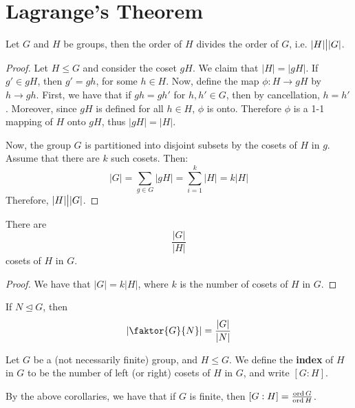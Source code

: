\section{Lagrange's Theorem}
\label{section_3.3}

\begin{theorem}\label{theorem_3.3.1}
  Let $G$ and  $H$ be groups, then the order of $H$ divides the order
  of $G$, i.e. $|H| \big{|} |G|$.
\end{theorem}
\begin{proof}
  Let $H \leq G$ and consider the coset $gH$. We claim that  $|H|=|gH|$.
  If $g' \in gH$, then  $g'=gh$, for some  $h \in H$. Now, define the map
  $\phi:H \rightarrow gH$ by $h \rightarrow gh$. First, we have that  if
  $gh=gh'$ for  $h,h' \in G$, then by cancellation, $h=h'$. Moreover, since
  $gH$ is defined for all  $h \in H$,  $\phi$ is onto. Therefore  $\phi$ is a
  1-1 mapping of  $H$ onto  $gH$, thus  $|gH|=|H|$.

  Now, the group $G$ is partitioned into disjoint subsets by the cosets of
  $H$ in  $g$. Assume that there are $k$ such cosets. Then:
  \begin{equation*}
    |G|=\sum_{g \in G}{|gH|}=\sum_{i=1}^k{|H|}=k|H|
  \end{equation*}
  Therefore, $|H| \big{|} |G|$.
\end{proof}
\begin{corollary}
  There are
  \begin{equation*}
    \frac{|G|}{|H|}
  \end{equation*}
  cosets of $H$ in  $G$.
\end{corollary}
\begin{proof}
  We have that $|G|=k|H|$, where  $k$ is the number of cosets of  $H$
  in  $G$.
\end{proof}
\begin{corollary}
  If $N \unlhd G$, then
  \begin{equation}
    |\faktor{G}{N}|=\frac{|G|}{|N|}
  \end{equation}
\end{corollary}

\begin{definition}
  Let $G$ be a (not necessarily finite) group, and  $H \leq G$. We define the
  \textbf{index} of $H$ in $G$ to be the number of left (or right) cosets of
  $H$ in $G$, and write $[G:H]$.
\end{definition}
\begin{remark}
  By the above corollaries, we have that if $G$ is finite, then
  $[G:H]=\frac{\operatorname{ord}{G}}{\operatorname{ord}{H}}$.
\end{remark}

